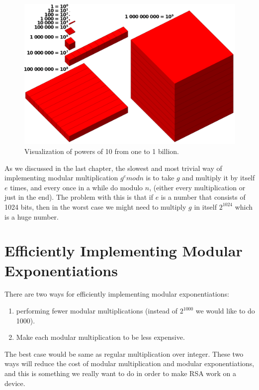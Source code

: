 \begin{figure}[!ht]
    \centering
    \includegraphics[scale=0.25]{images/vispow10.png}
    \caption{Visualization of powers of 10 from one to 1 billion.} \label{vispow10:fig}
\end{figure}

As we discussed in the last chapter, the slowest and most trivial way of
implementing modular multiplication \(g^e mod n\) is to take $g$ and multiply it by itself
$e$ times, and every once in a while do modulo $n$, 
(either every multiplication or just in the end). The problem with this is
that if $e$ is a number that consists of 1024 bits, then in the worst case 
 we might need to multiply $g$ in itself \( 2^{1024} \) which is a huge number.

\section{Efficiently Implementing Modular Exponentiations}\label{sec:Efficiently Implementing Modular Exponentiations}

There are two ways for efficiently implementing modular exponentiations:
\begin{enumerate} 
\item performing fewer modular multiplications (instead of  \( 2^{1000} \)  we would
    like to do 1000). 
\item Make each modular multiplication to be less expensive. 
\end{enumerate} 
The best case would be same as regular multiplication over integer.
These two ways will reduce the cost of modular multiplication and modular
exponentiations, and this is something we really want to do in order to make RSA work on
a device.

